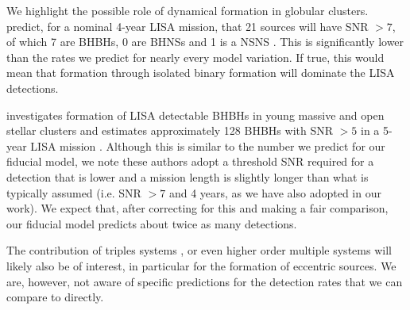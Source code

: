 We highlight the possible role of dynamical formation in globular clusters. \citet{Kremer+2018} predict, for a nominal 4-year LISA mission, that 21 sources will have SNR $> 7$, of which 7 are BHBHs, 0 are BHNSs and 1 is a NSNS \citep[see Table~1][]{Kremer+2018}. This is significantly lower than the rates we predict for nearly every model variation. If true, this would mean that formation through isolated binary formation will dominate the LISA detections. 

\citet{Banerjee+2020} investigates formation of LISA detectable BHBHs in young massive and open stellar clusters and estimates approximately 128 BHBHs with SNR $>5$ in a 5-year LISA mission \citep[see Table~1, Column 9][]{Banerjee+2020}. Although this is similar to the number we predict for our fiducial model, we note these authors adopt a threshold SNR required for a detection that is lower and a mission length is slightly longer than what is typically assumed (i.e. SNR $>7$ and 4 years, as we have also adopted in our work). We expect that, after correcting for this and making a fair comparison, our fiducial model predicts about twice as many detections.

The contribution of triples systems \citep[e.g.][]{Antonini+2017}, or even higher order multiple systems \citep[e.g.][]{Vynatheya+2021} will likely also be of interest, in particular for the formation of eccentric sources. We are, however, not aware of specific predictions for the detection rates that we can compare to directly.


